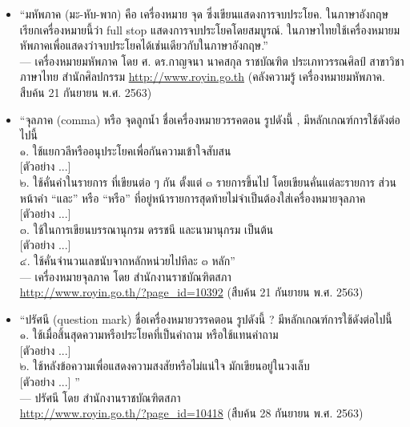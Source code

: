 
\begin{itemize}
\item ``มหัพภาค (มะ-หับ-พาก)  คือ เครื่องหมาย จุด ซึ่งเขียนแสดงการจบประโยค. ในภาษาอังกฤษเรียกเครื่องหมายนี้ว่า full stop แสดงการจบประโยคโดยสมบูรณ์.
ในภาษาไทยใช้เครื่องหมายมหัพภาคเพื่อแสดงว่าจบประโยคได้เช่นเดียวกับในภาษาอังกฤษ.''
\\
--- เครื่องหมายมหัพภาค โดย ศ. ดร.กาญจนา นาคสกุล ราชบัณฑิต  ประเภทวรรณศิลป์  สาขาวิชาภาษาไทย สำนักศิลปกรรม
\url{http://www.royin.go.th} 
(คลังความรู้ เครื่องหมายมหัพภาค. สืบค้น 21 กันยายน พ.ศ. 2563)

\item ``จุลภาค (comma) หรือ จุดลูกน้ำ
ชื่อเครื่องหมายวรรคตอน รูปดังนี้ ,
มีหลักเกณฑ์การใช้ดังต่อไปนี้\\
๑. ใช้แยกวลีหรืออนุประโยคเพื่อกันความเข้าใจสับสน\\
$[$ตัวอย่าง ...$]$\\
๒. ใช้คั่นคำในรายการ ที่เขียนต่อ ๆ กัน ตั้งแต่ ๓ รายการขึ้นไป โดยเขียนคั่นแต่ละรายการ ส่วนหน้าคำ “และ” หรือ “หรือ” ที่อยู่หน้ารายการสุดท้ายไม่จำเป็นต้องใส่เครื่องหมายจุลภาค\\
$[$ตัวอย่าง ...$]$\\
๓. ใช้ในการเขียนบรรณานุกรม ดรรชนี และนามานุกรม เป็นต้น\\
$[$ตัวอย่าง ...$]$\\
๔. ใช้คั่นจำนวนเลขนับจากหลักหน่วยไปทีละ ๓ หลัก''
\\
--- เครื่องหมายจุลภาค โดย สำนักงานราชบัณฑิตสภา \\ \url{http://www.royin.go.th/?page_id=10392} (สืบค้น 21 กันยายน พ.ศ. 2563)

\item ``ปรัศนี (question mark)
ชื่อเครื่องหมายวรรคตอน รูปดังนี้ ?
มีหลักเกณฑ์การใช้ดังต่อไปนี้\\
๑. ใช้เมื่อสิ้นสุดความหรือประโยคที่เป็นคำถาม หรือใช้แทนคำถาม\\
$[$ตัวอย่าง ...$]$\\
๒. ใช้หลังข้อความเพื่อแสดงความสงสัยหรือไม่แน่ใจ มักเขียนอยู่ในวงเล็บ\\
$[$ตัวอย่าง ...$]$%
''\\
--- ปรัศนี โดย สำนักงานราชบัณฑิตสภา \\
\url{http://www.royin.go.th/?page_id=10418} (สืบค้น 28 กันยายน พ.ศ. 2563)
\end{itemize}


